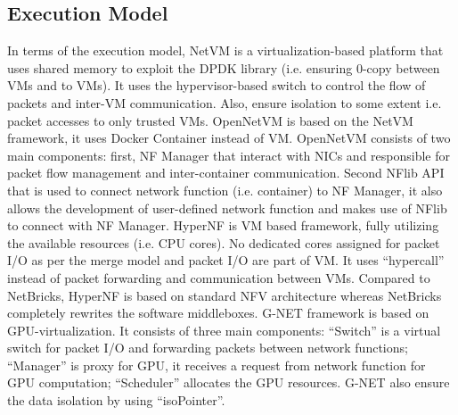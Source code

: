 \documentclass[10pt, a4paper, conference]{IEEEtran}
\begin{document}
\subsection{Execution Model}
In terms of the execution model, NetVM \cite{Hwang2015} is a virtualization-based platform that uses shared memory to exploit the DPDK library (i.e. ensuring 0-copy between VMs and to VMs). It uses the hypervisor-based switch to control the flow of packets and inter-VM communication. Also, ensure isolation to some extent i.e. packet accesses to only trusted VMs. OpenNetVM \cite{Yurchenko2018} is based on the NetVM framework, it uses Docker Container instead of VM. OpenNetVM consists of two main components: first, NF Manager that interact with NICs and responsible for packet flow management and inter-container communication. Second NFlib API that is used to connect network function (i.e. container) to NF Manager, it also allows the development of user-defined network function and makes use of NFlib to connect with NF Manager. HyperNF \cite{Yasukata2017} is VM based framework, fully utilizing the available resources (i.e. CPU cores). No dedicated cores assigned for packet I/O as per the merge model \cite{Yasukata2017} and packet I/O are part of VM. It uses “hypercall” instead of packet forwarding and communication between VMs. Compared to NetBricks, HyperNF is based on standard NFV architecture whereas NetBricks completely rewrites the software middleboxes. G-NET \cite{Zhang2018} framework is based on GPU-virtualization. It consists of three main components: “Switch” is a virtual switch for packet I/O and forwarding packets between network functions; “Manager” is proxy for GPU, it receives a request from network function for GPU computation; “Scheduler” allocates the GPU resources. G-NET also ensure the data isolation by using “isoPointer”.
\end{document}
